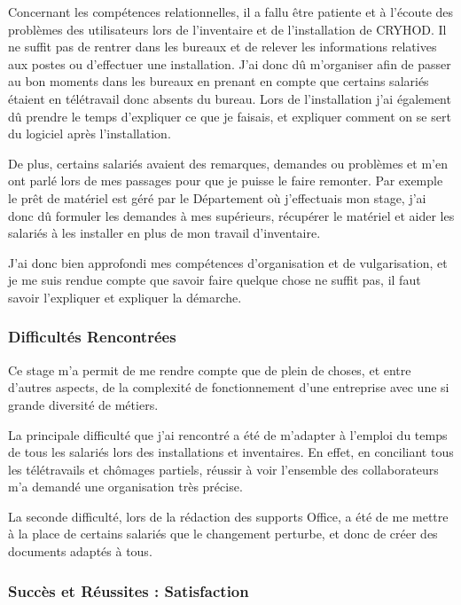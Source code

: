 Concernant les compétences relationnelles, il a fallu être patiente et à l'écoute des problèmes des utilisateurs lors de l'inventaire et de l'installation de CRYHOD. 
Il ne suffit pas de rentrer dans les bureaux et de relever les informations relatives aux postes ou d'effectuer une installation. J'ai donc dû m'organiser afin de passer au bon moments dans les bureaux en prenant en compte que certains salariés étaient en télétravail donc absents du bureau.
Lors de l'installation j'ai également dû prendre le temps d'expliquer ce que je faisais, et expliquer comment on se sert du logiciel après l'installation.

De plus, certains salariés avaient des remarques, demandes ou problèmes et m'en ont parlé lors de mes passages pour que je puisse le faire remonter.
Par exemple le prêt de matériel est géré par le Département où j'effectuais mon stage, j'ai donc dû formuler les demandes à mes supérieurs, récupérer le matériel et aider les salariés à les installer en plus de mon travail d'inventaire.

J'ai donc bien approfondi mes compétences d'organisation et de vulgarisation, et je me suis rendue compte que savoir faire quelque chose ne suffit pas, il faut savoir l'expliquer et expliquer la démarche.


\subsubsection*{Difficultés Rencontrées}

Ce stage m'a permit de me rendre compte que de plein de choses, et entre d'autres aspects, de la complexité de fonctionnement d'une entreprise avec une si grande diversité de métiers.

La principale difficulté que j'ai rencontré a été de m'adapter à l'emploi du temps de tous les salariés lors des installations et inventaires.
En effet, en conciliant tous les télétravails et chômages partiels, réussir à voir l'ensemble des collaborateurs m'a demandé une organisation très précise.

La seconde difficulté, lors de la rédaction des supports Office, a été de me mettre à la place de certains salariés que le changement perturbe, et donc de créer des documents adaptés à tous.


\subsubsection*{Succès et Réussites : Satisfaction}


